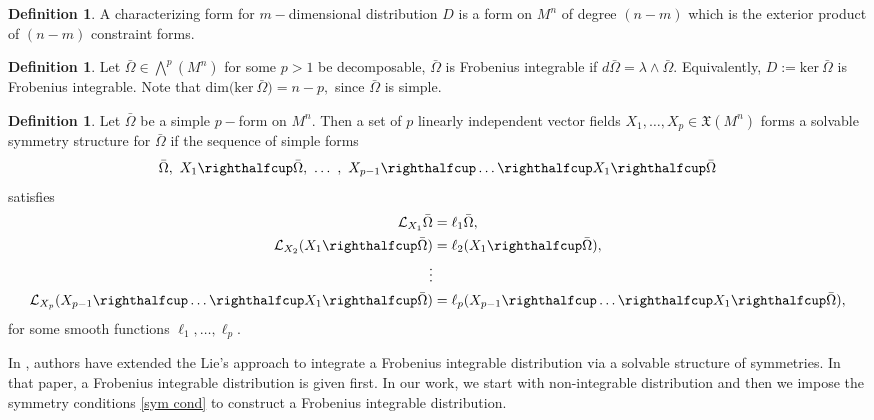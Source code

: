 \documentclass[a4paper, 11pt]{amsart}
\theoremstyle{definition}
\newtheorem{definition}[theorem]{Definition}
\begin{document}
\begin{definition}
A characterizing form for $m-$dimensional distribution $D$ is a form on $M^n$ of degree $(n-m)$ which is the exterior product of $(n-m)$ constraint forms.
\end{definition}
\begin{definition}
Let $\bar\Omega\in\bigwedge^p(M^n)$ for some $p>1$ be decomposable, $\bar\Omega$ is Frobenius integrable if $d\bar\Omega=\lambda\wedge\bar\Omega.$ Equivalently, $D:=\text{ker}\ \bar\Omega$ is Frobenius integrable. Note that $\text{dim(ker}\ \bar\Omega)= n-p,$ since $\bar\Omega$ is simple.
\end{definition}

\begin{definition} \label{def:sym cond}
   Let $\bar{\Omega}$ be a simple $p-$form on $M^n.$ Then a set of $p$ linearly independent vector fields $X_1,\dots,X_p\in \mathfrak{X}(M^n)$ forms a solvable symmetry structure for $\bar{\Omega}$ if the sequence of simple forms  $$\bar\Omega,\ X_1 \righthalfcup \bar\Omega,\ \dots\ ,\ X_{p-1}\righthalfcup \dots\righthalfcup  X_1\righthalfcup  \bar\Omega$$ satisfies
 \begin{align}\label{sym cond}
 \mathcal{L}_{X_1}\bar\Omega &=\ell_1\bar\Omega,\nonumber\\
 \mathcal{L}_{X_2}(X_1\righthalfcup\bar\Omega) &=\ell_2(X_1\righthalfcup\bar\Omega),\\
 \vdots\nonumber\\
 \mathcal{L}_{X_{p}}(X_{p-1}\righthalfcup\dots\righthalfcup X_1\righthalfcup\bar\Omega) &=\ell_{p}(X_{p-1}\righthalfcup\dots\righthalfcup X_1\righthalfcup\bar\Omega),\nonumber
 \end{align}
  for some smooth functions $\ell_1,\ldots,\ell_p.$
\end{definition}

  In \cite{sherr}, authors have extended the Lie's approach to integrate a Frobenius integrable distribution via a solvable structure of symmetries. In that paper, a Frobenius integrable distribution is given first. In our work, we start with non-integrable distribution and then we impose the symmetry conditions \eqref{sym cond} to construct a Frobenius integrable distribution.
\end{document}
